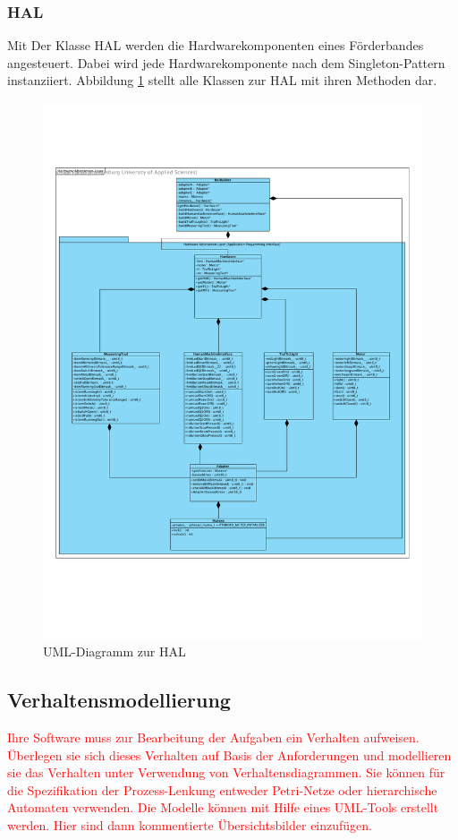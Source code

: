 \documentclass[a4paper, 11pt]{article}
\begin{document}
\subsubsection{HAL}
Mit Der Klasse HAL werden die Hardwarekomponenten eines Förderbandes angesteuert. Dabei wird jede Hardwarekomponente nach dem Singleton-Pattern instanziiert. Abbildung \ref{haluml} stellt alle Klassen zur HAL mit ihren Methoden dar.
\begin{figure}[h]
\centering 
\includegraphics[scale=0.6]{images/HAL_UML.pdf}
\caption{UML-Diagramm zur HAL}
\label{haluml}
\end{figure}

\subsection{Verhaltensmodellierung}
\textcolor{red}{Ihre Software muss zur Bearbeitung der Aufgaben ein Verhalten aufweisen. Überlegen sie sich dieses Verhalten auf Basis der Anforderungen und modellieren sie das Verhalten unter Verwendung von Verhaltensdiagrammen. Sie können für die Spezifikation der Prozess-Lenkung entweder Petri-Netze oder hierarchische Automaten verwenden. Die Modelle können mit Hilfe eines UML-Tools erstellt werden. Hier sind dann kommentierte Übersichtsbilder einzufügen.}
\end{document}
